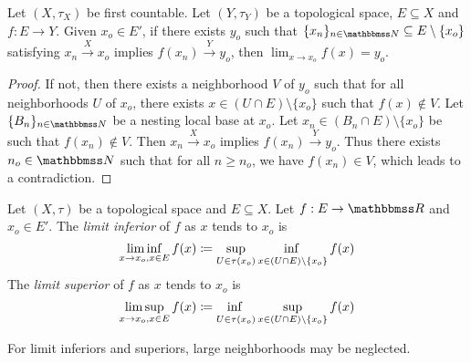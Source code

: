 \documentclass[screen,single]{techreport}
\numberwithin{equation}{section}
\begin{document}
\begin{proposition}\label{Prop:LimitFromFstCountExistIfSeqConv}
	Let $(X,\tau_X)$ be first countable.
	Let $(Y,\tau_Y)$ be a topological space, $E \subseteq X$ and $f: E \to Y$.
	Given $x_o \in E'$, if there exists $y_o$ such that $\{x_n\}_{n \in \bbN} \subseteq E \setminus \{x_o\}$ satisfying $x_n \xrightarrow{X} x_o$ implies $f(x_n) \xrightarrow{Y} y_o$, then $\lim_{x \to x_o} f(x) = y_o$.
\end{proposition}
\begin{proof}
  If not, then there exists a neighborhood $V$ of $y_o$ such that for all neighborhoods $U$ of $x_o$, there exists $x \in (U \cap E) \setminus \{x_o\}$ such that $f(x) \not\in V$.
  Let $\{B_n\}_{n \in \bbN}$ be a nesting local base at $x_o$.
  Let $x_n \in (B_n \cap E) \setminus \{x_o\}$ be such that $f(x_n) \not\in V$.
  Then $x_n \xrightarrow{X} x_o$ implies $f(x_n) \xrightarrow{Y} y_o$.
  Thus there exists $n_o \in \bbN$ such that for all $n \ge n_o$, we have $f(x_n) \in V$, which leads to a contradiction.
\end{proof}

\begin{definition}\label{De:LimitInfAndSup}
	Let $(X,\tau)$ be a topological space and $E \subseteq X$.
	Let $f : E \to \bbR$ and $x_o \in E'$.
	The \emph{limit inferior} of $f$ as $x$ tends to $x_o$ is
	\[
 	\liminf_{x \to x_o, x \in E} f(x) \coloneqq \adjustlimits \sup_{U \in \tau(x_o)} \inf_{x \in (U \cap E) \setminus \{x_o\}} f(x)
	\]
	The \emph{limit superior} of $f$ as $x$ tends to $x_o$ is
	\[
	\limsup_{x \to x_o, x \in E} f(x) \coloneqq \adjustlimits \inf_{U \in \tau(x_o)} \sup_{x \in (U \cap E) \setminus \{x_o\}} f(x)
	\]
\end{definition}

\begin{remark}\label{Rem:LimitInfAndSupNeglectLargeNeigh}
	For limit inferiors and superiors, large neighborhoods may be neglected.
\end{remark}
\end{document}
